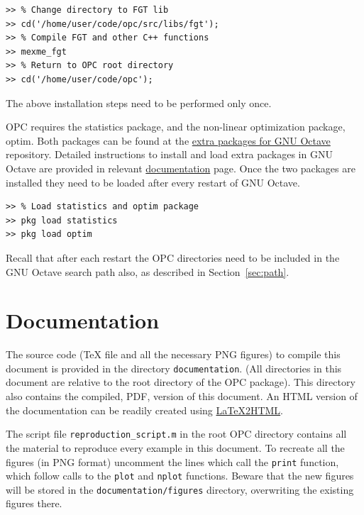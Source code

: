 \documentclass{book}
\begin{document}
\begin{verbatim}
>> % Change directory to FGT lib
>> cd('/home/user/code/opc/src/libs/fgt');
>> % Compile FGT and other C++ functions
>> mexme_fgt
>> % Return to OPC root directory
>> cd('/home/user/code/opc');
\end{verbatim}

\noindent
%
The above installation steps need to be performed only once.


OPC requires 
the statistics package, and the non-linear optimization package,
optim. 
%
Both packages can be found at the
\href{https://octave.sourceforge.io/packages.php}{extra packages for GNU
Octave} repository.
%
Detailed instructions to install and load extra packages in GNU Octave are provided
in relevant
\href{https://octave.org/doc/interpreter/Packages.html#Packages}{documentation}
page.
%
Once the two packages are installed they need to be loaded after every restart of
GNU Octave.

\begin{verbatim}
>> % Load statistics and optim package
>> pkg load statistics
>> pkg load optim
\end{verbatim}

\noindent
%
Recall that after each restart the OPC directories need to be included in the GNU Octave
search path also, as described in Section~\ref{sec:path}.


\section{Documentation}


The source code ({\TeX} file and all the necessary PNG figures) to compile this document is
provided in the directory {\tt documentation}. (All directories in this
document are relative to the root directory of the OPC package). This
directory also contains the compiled, PDF, version of this document.
%
An HTML version of the documentation can be readily created using
\href{http://www.latex2html.org/}{LaTeX2HTML}.
%
%



The script file {\tt reproduction\_script.m} in the root OPC directory
contains all the material to reproduce every example in this
document. To recreate all the figures (in PNG format) uncomment the
lines which call the {\tt print} function, which follow 
calls to the 
{\tt plot} and {\tt nplot} functions. Beware that the new figures
will be stored in the {\tt documentation/figures} directory,
overwriting the existing figures there.
\end{document}
